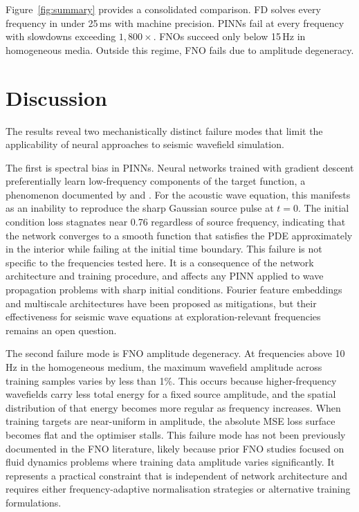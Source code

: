 \documentclass[12pt,a4paper]{article}
\begin{document}
Figure~\ref{fig:summary} provides a consolidated comparison.
FD solves every frequency in under 25\,ms with machine precision.
PINNs fail at every frequency with slowdowns exceeding
$1{,}800\times$. FNOs succeed only below 15\,Hz in homogeneous
media. Outside this regime, FNO fails due to amplitude
degeneracy.

\section{Discussion}
\label{sec:discussion}

The results reveal two mechanistically distinct failure modes
that limit the applicability of neural approaches to seismic
wavefield simulation.

The first is spectral bias in PINNs. Neural networks trained
with gradient descent preferentially learn low-frequency
components of the target function, a phenomenon documented by
\citet{rahaman2019} and \citet{tancik2020}. For the acoustic
wave equation, this manifests as an inability to reproduce the
sharp Gaussian source pulse at $t = 0$. The initial condition
loss stagnates near 0.76 regardless of source frequency,
indicating that the network converges to a smooth function that
satisfies the PDE approximately in the interior while failing at
the initial time boundary. This failure is not specific to the
frequencies tested here. It is a consequence of the network
architecture and training procedure, and affects any PINN applied
to wave propagation problems with sharp initial conditions.
Fourier feature embeddings and multiscale architectures have been
proposed as mitigations, but their effectiveness for seismic wave
equations at exploration-relevant frequencies remains an open
question.

The second failure mode is FNO amplitude degeneracy. At
frequencies above 10\,Hz in the homogeneous medium, the maximum
wavefield amplitude across training samples varies by less than
1\%. This occurs because higher-frequency wavefields carry less
total energy for a fixed source amplitude, and the spatial
distribution of that energy becomes more regular as frequency
increases. When training targets are near-uniform in amplitude,
the absolute MSE loss surface becomes flat and the optimiser
stalls. This failure mode has not been previously documented in
the FNO literature, likely because prior FNO studies focused on
fluid dynamics problems where training data amplitude varies
significantly. It represents a practical constraint that is
independent of network architecture and requires either
frequency-adaptive normalisation strategies or alternative
training formulations.
\end{document}
